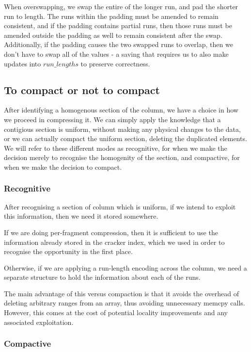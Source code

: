 When overswapping, we swap the entire of the longer run, and pad the shorter run to length. The runs
within the padding must be amended to remain consistent, and if the padding contains partial runs,
then those runs must be amended outside the padding as well to remain consistent after the swap.
Additionally, if the padding causes the two swapped runs to overlap, then we don't have to swap all of
the values - a saving that requires us to also make updates into $run\_lengths$ to preserve
correctness.

\subsection{To compact or not to compact}

After identifying a homogenous section of the column, we have a choice in how we proceed in
compressing it. We can simply apply the knowledge that a contigious section is uniform, without 
making any physical changes to the data, or we can actually compact the uniform section, deleting
the duplicated elements. We will refer to these different modes as recognitive, for when we make the decision merely to recognise the homogenity of the section, and compactive, for when we make the
decision to compact.

\subsubsection{Recognitive}

After recognising a section of column which is uniform, if we intend to exploit this information, then
we need it stored somewhere.

If we are doing per-fragment compression, then it is sufficient to use the information already stored
in the cracker index, which we used in order to recognise the opportunity in the first place.

Otherwise, if we are applying a run-length encoding across the column, we need a separate structure to
hold the information about each of the runs.

The main advantage of this versus compaction is that it avoids the overhead of deleting arbitrary ranges from an array, thus avoiding unnecessary memcpy calls. However, this comes at the cost of
potential locality improvements and any associated exploitation.

\subsubsection{Compactive}

